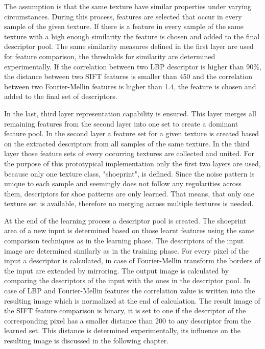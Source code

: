 \documentclass[draft,final]{vutinfth} %
\begin{document}
The assumption is that the same texture have similar properties under varying circumstances.
During this process, features are selected that occur in every sample of the given texture.
If there is a feature in every sample of the same texture with a high enough similarity the feature is chosen and added to the final descriptor pool.
The same similarity measures defined in the first layer are used for feature comparison, the thresholds for similarity are determined experimentally.
If the correlation between two LBP descriptor is higher than 90\%, the distance between two SIFT features is smaller than 450 and the correlation between two Fourier-Mellin features is higher than 1.4, the feature is chosen and added to the final set of descriptors.
\par
In the last, third layer representation capability is ensured.
This layer merges all remaining features from the second layer into one set to create a dominant feature pool.
In the second layer a feature set for a given texture is created based on the extracted descriptors from all samples of the same texture.
In the third layer those feature sets of every occurring textures are collected and united.
For the purpose of this prototypical implementation only the first two layers are used, because only one texture class, "shoeprint", is defined.
Since the noise pattern is unique to each sample and seemingly does not follow any regularities across them, descriptors for shoe patterns are only learned.
That means, that only one texture set is available, therefore no merging across multiple textures is needed.
\par
At the end of the learning process a descriptor pool is created.
The shoeprint area of a new input is determined based on those learnt features using the same comparison techniques as in the learning phase.
The descriptors of the input image are determined similarly as in the training phase.
For every pixel of the input a descriptor is calculated, in case of Fourier-Mellin transform the borders of the input are extended by mirroring.
The output image is calculated by comparing the descriptors of the input with the ones in the descriptor pool.
In case of LBP and Fourier-Mellin features the correlation value is written into the resulting image which is normalized at the end of calculation.
The result image of the SIFT feature comparison is binary, it is set to one if the descriptor of the corresponding pixel has a smaller distance than 200 to any descriptor from the learned set.
This distance is determined experimentally, its influence on the resulting image is discussed in the following chapter.
\end{document}
